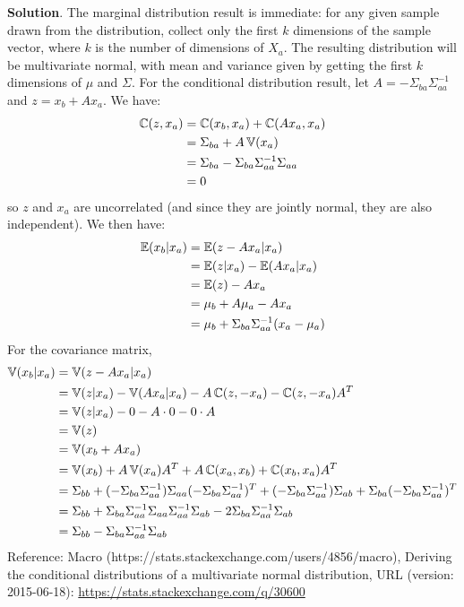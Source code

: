 \textbf{Solution}.
The marginal distribution result is immediate: for any given sample
drawn from the distribution, collect only the first \(k\) dimensions of
the sample vector, where \(k\) is the number of dimensions of \(X_a\).
The resulting distribution will be multivariate normal, with mean and
variance given by getting the first \(k\) dimensions of \(\mu\) and
\(\Sigma\).
For the conditional distribution result, let
\(A = -\Sigma_{ba} \Sigma_{aa}^{-1}\) and \(z = x_b + A x_a\). We have:
\begin{align*}
\operatorname{\mathbb{C}}(z, x_a) &= \operatorname{\mathbb{C}}(x_b, x_a) + \operatorname{\mathbb{C}}(A x_a, x_a) \\
&= \Sigma_{ba} + A \operatorname{\mathbb{V}}(x_a) \\
&= \Sigma_{ba} - \Sigma_{ba} \Sigma_{aa}^{-1} \Sigma_{aa} \\
&= 0
\end{align*}
so \(z\) and \(x_a\) are uncorrelated (and since they are jointly
normal, they are also independent). We then have:
\begin{align*}
\operatorname{\mathbb{E}}(x_b | x_a) &= \operatorname{\mathbb{E}}(z - A x_a | x_a) \\
&= \operatorname{\mathbb{E}}(z | x_a) - \operatorname{\mathbb{E}}(A x_a | x_a) \\
&= \operatorname{\mathbb{E}}(z) - A x_a \\
&= \mu_b + A \mu_a - A x_a \\
&= \mu_b + \Sigma_{ba} \Sigma_{aa}^{-1} (x_a - \mu_a)
\end{align*}
For the covariance matrix,
\begin{align*}
\operatorname{\mathbb{V}}(x_b | x_a) &= \operatorname{\mathbb{V}}(z - A x_a | x_a) \\
&= \operatorname{\mathbb{V}}(z | x_a) - \operatorname{\mathbb{V}}(A x_a | x_a) - A \operatorname{\mathbb{C}}(z, -x_a) - \operatorname{\mathbb{C}}(z, -x_a) A^T \\
&= \operatorname{\mathbb{V}}(z | x_a) - 0 - A \cdot 0 - 0 \cdot A \\
&= \operatorname{\mathbb{V}}(z) \\
&= \operatorname{\mathbb{V}}(x_b + A x_a) \\
&= \operatorname{\mathbb{V}}(x_b) + A \operatorname{\mathbb{V}}(x_a) A^T + A \operatorname{\mathbb{C}}(x_a, x_b) + \operatorname{\mathbb{C}}(x_b, x_a) A^T \\
&= \Sigma_{bb} + (- \Sigma_{ba} \Sigma_{aa}^{-1}) \Sigma_{aa} (- \Sigma_{ba} \Sigma_{aa}^{-1})^T + (- \Sigma_{ba} \Sigma_{aa}^{-1}) \Sigma_{ab} + \Sigma_{ba} (- \Sigma_{ba} \Sigma_{aa}^{-1})^T \\
&= \Sigma_{bb} + \Sigma_{ba} \Sigma_{aa}^{-1} \Sigma_{aa} \Sigma_{aa}^{-1} \Sigma_{ab} - 2 \Sigma_{ba}\Sigma_{aa}^{-1}\Sigma_{ab} \\
&= \Sigma_{bb} - \Sigma_{ba}\Sigma_{aa}^{-1}\Sigma_{ab}
\end{align*}
Reference: Macro (https://stats.stackexchange.com/users/4856/macro),
Deriving the conditional distributions of a multivariate normal
distribution, URL (version: 2015-06-18):
\url{https://stats.stackexchange.com/q/30600}

